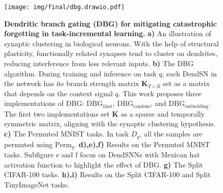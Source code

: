 \begin{figure}[tp!]
    \centering
    \texttt{[image: img/final/dbg.drawio.pdf]}
    \caption{
        \textbf{Dendritic branch gating (DBG) for mitigating catastrophic forgetting in task-incremental learning.}
        \textbf{a)} An illustration of synaptic clustering in biological neurons. With the help of structural plasticity, functionally related synapses tend to cluster on dendrites, reducing interference from less relevant inputs.
        \textbf{b)} The DBG algorithm. During training and inference on task $q$, each DendSN in the network has its branch strength matrix $\mathbf{K}_{T\times B}$ set as a matrix that depends on the context signal $q$. This work proposes three implementations of DBG: $\mathrm{DBG}_{\mathrm{1hot}}$, $\mathrm{DBG}_{\mathrm{random}}$, and $\mathrm{DBG}_{\mathrm{embedding}}$. The first two implementations set $\mathbf{K}$ as a sparse and temporally symmetric matrix, aligning with the synaptic clustering hypothesis.
        \textbf{c)} The Permuted MNIST tasks. In task $D_q$, all the samples are permuted using $\mathrm{Perm}_q$.
        \textbf{d),e),f)} Results on the Permuted MNIST tasks. Subfigure e and f focus on DendSNNs with Mexican hat activation function to highlight the effect of DBG.
        \textbf{g)} The Split CIFAR-100 tasks.
        \textbf{h),i)} Results on the Split CIFAR-100 and Split TinyImageNet tasks.
    }
    \label{fig:dbg}
\end{figure}

